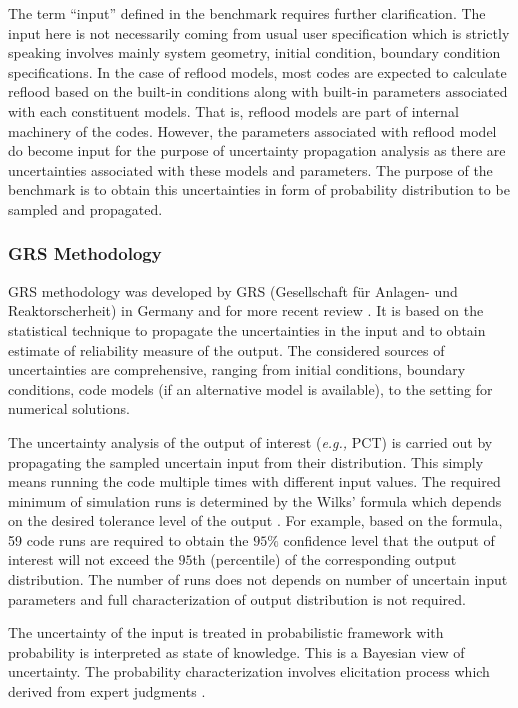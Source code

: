 \documentclass[11pt,titlepage]{article}
\begin{document}
The term ``input'' defined in the benchmark requires further clarification. 
The input here is not necessarily coming from usual user specification which is strictly speaking involves mainly system geometry, initial condition, boundary condition specifications. 
In the case of reflood models, most codes are expected to calculate reflood based on the built-in conditions along with built-in parameters associated with each constituent models. 
That is, reflood models are part of internal machinery of the codes. 
However, the parameters associated with reflood model do become input for the purpose of uncertainty propagation analysis as there are uncertainties associated with these models and parameters. 
The purpose of the benchmark is to obtain this uncertainties in form of probability distribution to be sampled and propagated. 

\subsubsection{GRS Methodology}

GRS methodology was developed by GRS (Gesellschaft f\"ur Anlagen- und Reaktorscherheit) in Germany \cite{Glaeser1994} and for more recent review \cite{Glaeser2008}. 
It is based on the statistical technique to propagate the uncertainties in the input and to obtain estimate of reliability measure of the output. 
The considered sources of uncertainties are comprehensive, ranging from initial conditions, boundary conditions, code models (if an alternative model is available), to the setting for numerical solutions.

The uncertainty analysis of the output of interest (\textit{e.g.,} PCT) is carried out by propagating the sampled uncertain input from their distribution. 
This simply means running the code multiple times with different input values. 
The required minimum of simulation runs is determined by the Wilks' formula \cite{Wilks1942} which depends on the desired tolerance level of the output \cite{Glaeser2008}. 
For example, based on the formula, 59 code runs are required to obtain the $95\%$ confidence level that the output of interest will not exceed the $95$th (percentile) of the corresponding output distribution.
The number of runs does not depends on number of uncertain input parameters and full characterization of output distribution is not required.

The uncertainty of the input is treated in probabilistic framework with probability is interpreted as state of knowledge. 
This is a Bayesian view of uncertainty. 
The probability characterization involves elicitation process which derived from expert judgments \cite{Glaeser1994}. 
\end{document}
